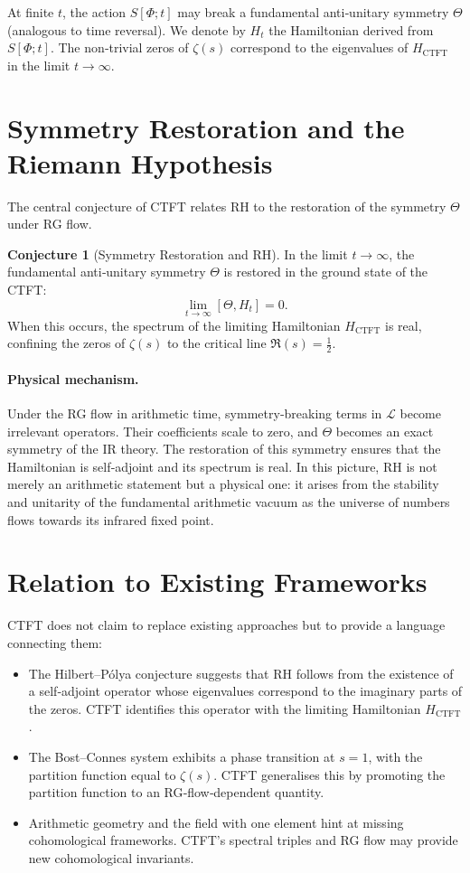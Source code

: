 \documentclass[11pt, a4paper]{article}
\theoremstyle{definition}
\newtheorem{conjecture}{Conjecture}[section]
\newcommand{\Lagr}{\mathcal{L}}
\begin{document}
At finite $t$, the action $S[\Phi; t]$ may break a fundamental anti‑unitary symmetry $\Theta$ (analogous to time reversal).  We denote by $H_t$ the Hamiltonian derived from $S[\Phi; t]$.  The non‑trivial zeros of $\zeta(s)$ correspond to the eigenvalues of $H_{\mathrm{CTFT}}$ in the limit $t\to\infty$.

\section{Symmetry Restoration and the Riemann Hypothesis}

The central conjecture of CTFT relates RH to the restoration of the symmetry $\Theta$ under RG flow.

\begin{conjecture}[Symmetry Restoration and RH]
In the limit $t\to\infty$, the fundamental anti‑unitary symmetry $\Theta$ is restored in the ground state of the CTFT:
\[
    \lim_{t\to\infty} [\Theta, H_t] = 0.
\]
When this occurs, the spectrum of the limiting Hamiltonian $H_{\mathrm{CTFT}}$ is real, confining the zeros of $\zeta(s)$ to the critical line $\Re(s)=\tfrac12$.
\end{conjecture}

\paragraph{Physical mechanism.}  Under the RG flow in arithmetic time, symmetry‑breaking terms in $\Lagr$ become irrelevant operators.  Their coefficients scale to zero, and $\Theta$ becomes an exact symmetry of the IR theory.  The restoration of this symmetry ensures that the Hamiltonian is self‑adjoint and its spectrum is real.  In this picture, RH is not merely an arithmetic statement but a physical one: it arises from the stability and unitarity of the fundamental arithmetic vacuum as the universe of numbers flows towards its infrared fixed point.

\section{Relation to Existing Frameworks}

CTFT does not claim to replace existing approaches but to provide a language connecting them:

\begin{itemize}
    \item The Hilbert–Pólya conjecture suggests that RH follows from the existence of a self‑adjoint operator whose eigenvalues correspond to the imaginary parts of the zeros.  CTFT identifies this operator with the limiting Hamiltonian $H_{\mathrm{CTFT}}$.
    \item The Bost–Connes system exhibits a phase transition at $s=1$, with the partition function equal to $\zeta(s)$.  CTFT generalises this by promoting the partition function to an RG‑flow‑dependent quantity.
    \item Arithmetic geometry and the field with one element hint at missing cohomological frameworks.  CTFT’s spectral triples and RG flow may provide new cohomological invariants.
\end{itemize}
\end{document}
